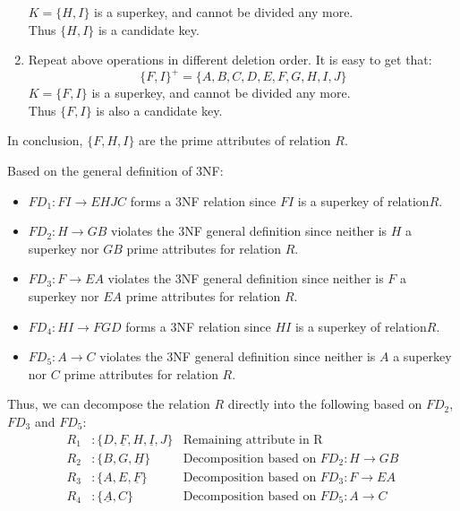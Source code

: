 \documentclass[11pt,letterpaper,titlepage,en-US]{article}
\begin{document}
\begin{homeworkProblem}
\begin{homeworkSubProblem}
\begin{enumerate}[label=\textbf{Step {\arabic*}}, leftmargin=2cm]
                $K = \{H,I\}$ is a superkey, and cannot be divided any more.\\
                Thus $\{H, I\}$ is a candidate key.
            \item Repeat above operations in different deletion order. It is easy to get that:\[\{F,I\}^+ = \{A,B,C,D,E,F,G,H,I,J\}\]
                $K = \{F,I\}$ is a superkey, and cannot be divided any more.\\
                Thus $\{F, I\}$ is also a candidate key.
        \end{enumerate}
        In conclusion, $\{F, H, I\}$ are the prime attributes of relation $R$.

    \end{homeworkSubProblem}

    \begin{homeworkSubProblem}
        Based on the general definition of 3NF:
        \begin{itemize}
            \item $FD_1: FI \rightarrow EHJC$ forms a 3NF relation since $FI$ is a superkey of relation$R$.
            \item $FD_2: H \rightarrow GB$ violates the 3NF general definition since neither is $H$ a superkey nor $GB$ prime attributes for relation $R$.
            \item $FD_3: F \rightarrow EA$ violates the 3NF general definition since neither is $F$ a superkey nor $EA$ prime attributes for relation $R$.
            \item $FD_4: HI \rightarrow FGD$ forms a 3NF relation since $HI$ is a superkey of relation$R$.
            \item $FD_5: A \rightarrow C$ violates the 3NF general definition since neither is $A$ a superkey nor $C$ prime attributes for relation $R$.
        \end{itemize}

        Thus, we can decompose the relation $R$ directly into the following based on $FD_2$, $FD_3$ and $FD_5$:
        \begin{align*}
            R_1& : \{D, \underline{F}, H, \underline{I}, J\} & \text{Remaining attribute in R}\\
            R_2& : \{B, G, \underline{H}\} & \text{Decomposition based on $FD_2: H \rightarrow GB$}\\
            R_3& : \{A, E, \underline{F}\} & \text{Decomposition based on $FD_3: F \rightarrow EA$}\\
            R_4& : \{\underline{A}, C\} & \text{Decomposition based on $FD_5: A \rightarrow C$}\\
        \end{align*}
    \end{homeworkSubProblem}
\end{homeworkProblem}
\end{document}
